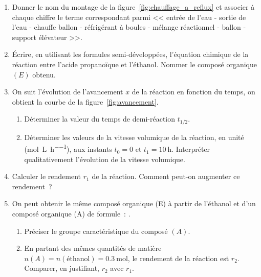 \begin{enumerate}
    \item Donner le nom du montage de la figure~\ref{fig:chauffage_a_reflux} et
          associer à chaque chiffre le terme correspondant parmi << entrée de
          l'eau - sortie de l'eau - chauffe ballon - réfrigérant à boules -
          mélange réactionnel - ballon - support élévateur >>.
    \item Écrire, en utilisant les formules semi-développées, l'équation
          chimique de la réaction entre l'acide propanoïque et l'éthanol. Nommer
          le composé organique $(E)$ obtenu.
    \item On suit l'évolution de l'avancement $x$ de la réaction en fonction du
          temps, on obtient la courbe de la figure~\ref{fig:avancement}.
          \begin{enumerate}
              \item Déterminer la valeur du temps de demi-réaction $t_{1/2}$.
              \item Déterminer les valeurs de la vitesse volumique de la
                    réaction, en unité (\unit{\mol\per\liter\per\hour}), aux
                    instants $t_{0}=0$ et $t_{1}=\qty{10}{\hour}$. Interpréter
                    qualitativement l'évolution de la vitesse volumique.
          \end{enumerate}
    \item Calculer le rendement $r_{1}$ de la réaction. Comment peut-on
          augmenter ce rendement~?
    \item On peut obtenir le même composé organique (E) à partir de l'éthanol
          et d'un composé organique (A) de formule~:
          .
          \begin{enumerate}
              \item Préciser le groupe caractéristique du composé $(A)$.
              \item En partant des mêmes quantités de matière
                    $n(A)=n(\text{éthanol})=\qty{0,3}{\mole}$, le rendement de
                    la réaction est $r_{2}$. Comparer, en justifiant, $r_{2}$
                    avec $r_{1}$.
          \end{enumerate}
\end{enumerate}
